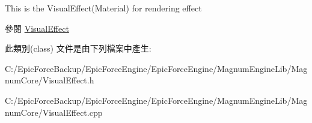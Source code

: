 This is the Visual\+Effect(\+Material) for rendering effect \begin{DoxySeeAlso}{參閱}
\hyperlink{class_magnum_1_1_visual_effect}{Visual\+Effect} 
\end{DoxySeeAlso}


此類別(class) 文件是由下列檔案中產生\+:\begin{DoxyCompactItemize}
\item 
C\+:/\+Epic\+Force\+Backup/\+Epic\+Force\+Engine/\+Epic\+Force\+Engine/\+Magnum\+Engine\+Lib/\+Magnum\+Core/Visual\+Effect.\+h\item 
C\+:/\+Epic\+Force\+Backup/\+Epic\+Force\+Engine/\+Epic\+Force\+Engine/\+Magnum\+Engine\+Lib/\+Magnum\+Core/Visual\+Effect.\+cpp\end{DoxyCompactItemize}

